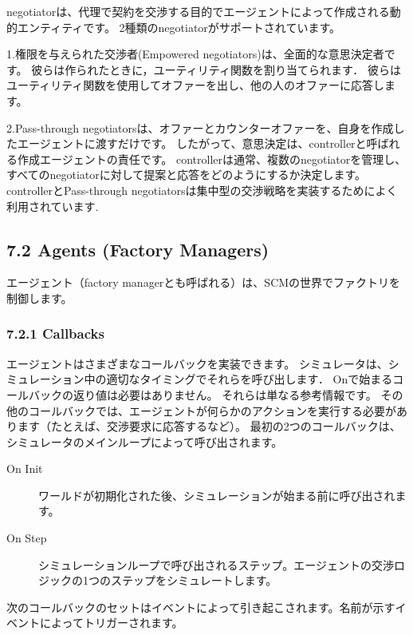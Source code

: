 \documentclass[12pt]{jarticle}
\begin{document}
negotiatorは、代理で契約を交渉する目的でエージェントによって作成される動的エンティティです。
2種類のnegotiatorがサポートされています。

1.権限を与えられた交渉者(Empowered negotiators)は、全面的な意思決定者です。
彼らは作られたときに，ユーティリティ関数を割り当てられます．
彼らはユーティリティ関数を使用してオファーを出し、他の人のオファーに応答します。

2.Pass-through negotiatorsは、オファーとカウンターオファーを、自身を作成したエージェントに渡すだけです。
したがって、意思決定は、controllerと呼ばれる作成エージェントの責任です。
controllerは通常、複数のnegotiatorを管理し、すべてのnegotiatorに対して提案と応答をどのようにするか決定します。
controllerとPass-through negotiatorsは集中型の交渉戦略を実装するためによく利用されています.

\subsection{7.2 Agents (Factory Managers)}
エージェント（factory managerとも呼ばれる）は、SCMの世界でファクトリを制御します。

\subsubsection{7.2.1 Callbacks}
エージェントはさまざまなコールバックを実装できます。
シミュレータは、シミュレーション中の適切なタイミングでそれらを呼び出します．
Onで始まるコールバックの返り値は必要はありません。
それらは単なる参考情報です。
その他のコールバックでは、エージェントが何らかのアクションを実行する必要があります（たとえば、交渉要求に応答するなど）。
最初の2つのコールバックは、シミュレータのメインループによって呼び出されます。

\begin{description}
  \item[On Init] ワールドが初期化された後、シミュレーションが始まる前に呼び出されます。
  \item[On Step] シミュレーションループで呼び出されるステップ。エージェントの交渉ロジックの1つのステップをシミュレートします。
\end{description} 

次のコールバックのセットはイベントによって引き起こされます。名前が示すイベントによってトリガーされます。
\end{document}
